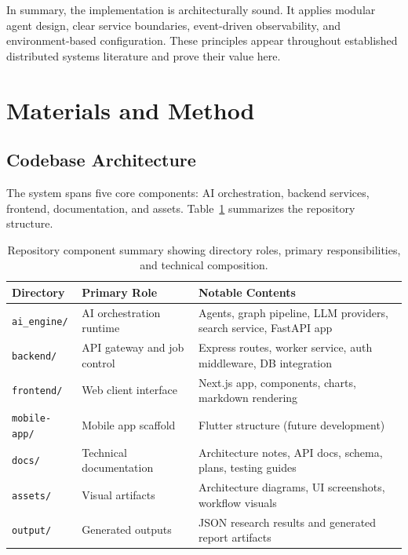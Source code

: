 \documentclass[12pt, a4paper]{article}
\begin{document}
In summary, the implementation is architecturally sound. It applies modular agent design,
clear service boundaries, event-driven observability, and environment-based configuration.
These principles appear throughout established distributed systems literature and prove
their value here.

\section{Materials and Method}

\subsection{Codebase Architecture}

The system spans five core components: AI orchestration, backend services, frontend, documentation, and assets.
Table~\ref{tab:repo_structure} summarizes the repository structure.

\begin{table}[H]
\centering
\caption{Repository component summary showing directory roles, primary responsibilities, and technical composition.}
\label{tab:repo_structure}
\begin{tabular}{p{2.4cm}|p{3.6cm}|p{5.0cm}}
\toprule
\textbf{Directory} & \textbf{Primary Role} & \textbf{Notable Contents} \\
\midrule
\texttt{ai\_engine/} & AI orchestration runtime & Agents, graph pipeline, LLM providers, search service, FastAPI app \\
\texttt{backend/} & API gateway and job control & Express routes, worker service, auth middleware, DB integration \\
\texttt{frontend/} & Web client interface & Next.js app, components, charts, markdown rendering \\
\texttt{mobile-app/} & Mobile app scaffold & Flutter structure (future development) \\
\texttt{docs/} & Technical documentation & Architecture notes, API docs, schema, plans, testing guides \\
\texttt{assets/} & Visual artifacts & Architecture diagrams, UI screenshots, workflow visuals \\
\texttt{output/} & Generated outputs & JSON research results and generated report artifacts \\
\bottomrule
\end{tabular}
\end{table}
\end{document}
